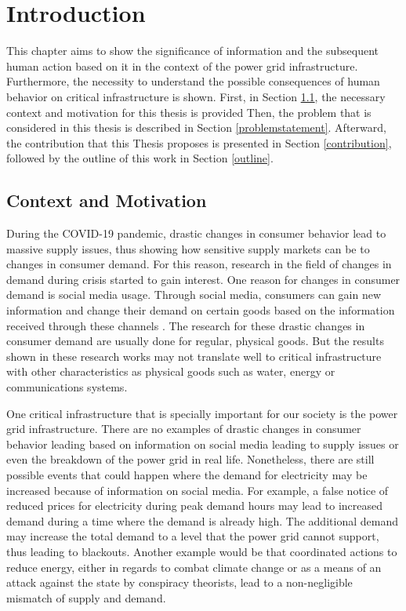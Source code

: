 \chapter{Introduction}

This chapter aims to show the significance of information and 
the subsequent human action based on it
in the context of the power grid infrastructure.
Furthermore, the necessity to understand the possible consequences 
of human behavior on critical infrastructure is shown. 
First, in Section \ref{contextmotivation}, the necessary context and motivation for this thesis is provided
Then, the problem that is considered in this thesis is described 
in Section \ref{problemstatement}. Afterward, the contribution that this
Thesis proposes is presented in Section \ref{contribution}, 
followed by the outline of this work in Section \ref{outline}.

\section{Context and Motivation}
\label{contextmotivation}

During the COVID-19 pandemic, drastic changes in consumer behavior
lead to massive supply issues, thus showing how sensitive supply markets 
can be to changes in consumer demand.
For this reason, research in the field of changes in demand during crisis
started to gain interest. One reason for changes in consumer demand is 
social media usage. Through social media, consumers can gain new information
and change their demand on certain goods based on the information received 
through these channels \cite{naeem2021social}.
The research for these drastic changes in consumer demand are usually
done for regular, physical goods. But the results shown in these 
research works may not translate well to critical infrastructure
with other characteristics as physical goods such as 
water, energy or communications systems.

One critical infrastructure that is specially important for 
our society is the power grid infrastructure.
There are no examples of drastic changes in consumer behavior leading
based on information on social media leading to supply issues or
even the breakdown of the power grid in real life. Nonetheless, there 
are still possible events that could happen where the demand for
electricity may be increased because of information on social media.
For example, a false notice of reduced prices for electricity
during peak demand hours may lead to increased demand during 
a time where the demand is already high. The additional demand
may increase the total demand to a level that the power grid
cannot support, thus leading to blackouts.
Another example would be that coordinated actions to reduce
energy, either in regards to combat climate change \cite{earthday}
or as a means of an attack against the state by conspiracy theorists,
lead to a non-negligible mismatch of supply and demand.

